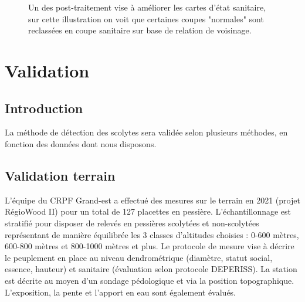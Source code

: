 \documentclass[a4paper, 12pt]{article} %
\begin{document}
\begin{figure}
\begin{minipage}[b]{.49\linewidth}
\end{minipage}
	\label{fig:clean}
	\caption{Un des post-traitement vise à améliorer les cartes d'état sanitaire, sur cette illustration on voit que certaines coupes "normales" sont reclassées en coupe sanitaire sur base de relation de voisinage.}
\end{figure}

\section{Validation}

\subsection{Introduction}

La méthode de détection des scolytes sera validée selon plusieurs méthodes, en fonction des données dont nous disposons.

\subsection{Validation terrain}

L'équipe du CRPF Grand-est a effectué des mesures sur le terrain en 2021 (projet RégioWood II) pour un total de 127 placettes en pessière. L'échantillonnage est stratifié pour disposer de relevés en pessières scolytées et non-scolytées représentant de manière équilibrée les 3 classes d'altitudes choisies : 0-600 mètres, 600-800 mètres et 800-1000 mètres et plus. Le protocole de mesure vise à décrire le peuplement en place au niveau dendrométrique (diamètre, statut social, essence, hauteur) et sanitaire (évaluation selon protocole DEPERISS). La station est décrite au moyen d'un sondage pédologique et via la position topographique. L'exposition, la pente et l'apport en eau sont également évalués.
\end{document}

